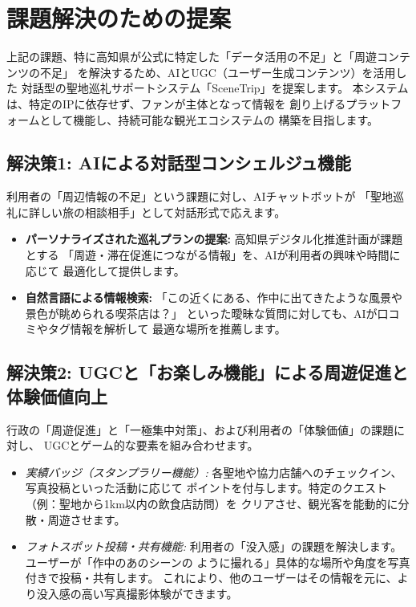 \documentclass{docs}
\begin{document}
\section{課題解決のための提案}
上記の課題、特に高知県が公式に特定した「データ活用の不足」と「周遊コンテンツの不足」\cite{kochi_dx_plan}
を解決するため、AIとUGC（ユーザー生成コンテンツ）を活用した
対話型の聖地巡礼サポートシステム「SceneTrip」を提案します。
本システムは、特定のIPに依存せず、ファンが主体となって情報を
創り上げるプラットフォームとして機能し、持続可能な観光エコシステムの
構築を目指します。

\subsection{解決策1: AIによる対話型コンシェルジュ機能}
利用者の「周辺情報の不足」という課題に対し、AIチャットボットが
「聖地巡礼に詳しい旅の相談相手」として対話形式で応えます。
\begin{itemize}
	\item \textbf{パーソナライズされた巡礼プランの提案:}
	高知県デジタル化推進計画\cite{kochi_dx_plan}が課題とする
	「周遊・滞在促進につながる情報」を、AIが利用者の興味や時間に応じて
	最適化して提供します。
	\item \textbf{自然言語による情報検索:}
	「この近くにある、作中に出てきたような風景や景色が眺められる喫茶店は？」
	といった曖昧な質問に対しても、AIが口コミやタグ情報を解析して
	最適な場所を推薦します。
\end{itemize}

\subsection{解決策2: UGCと「お楽しみ機能」による周遊促進と体験価値向上}
行政の「周遊促進」と「一極集中対策」、および利用者の「体験価値」の課題に対し、
UGCとゲーム的な要素を組み合わせます。
\begin{itemize}
	\item \emph{実績バッジ（スタンプラリー機能）:}
	各聖地や協力店舗へのチェックイン、写真投稿といった活動に応じて
	ポイントを付与します。特定のクエスト（例：聖地から1km以内の飲食店訪問）を
	クリアさせ、観光客を能動的に分散・周遊させます。
	\item \emph{フォトスポット投稿・共有機能:}
	利用者の「没入感」の課題を解決します。ユーザーが「作中のあのシーンの
	ように撮れる」具体的な場所や角度を写真付きで投稿・共有します。
	これにより、他のユーザーはその情報を元に、より没入感の高い写真撮影体験ができます。
\end{itemize}
\end{document}
